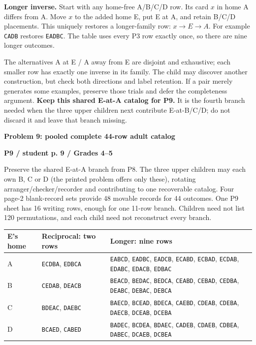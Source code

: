 \documentclass[11pt]{article}
\newcommand{\heading}[1]{\par\textbf{\large #1}\par}
\newcommand{\subhead}[1]{\par\textbf{#1}\par}
\newcommand{\row}[1]{\texttt{#1}}
\newcommand{\guidepage}{\newpage}
\begin{document}
\textbf{Longer inverse.} Start with any home-free A/B/C/D row. Its card $x$ in home A differs from A. Move $x$ to the added home E, put E at A, and retain B/C/D placements. This uniquely restores a longer-family row: $x\to E\to A$. For example \row{CADB} restores \row{EADBC}. The table uses every P3 row exactly once, so there are nine longer outcomes.

The alternatives A at E / A away from E are disjoint and exhaustive; each smaller row has exactly one inverse in its family. The child may discover another construction, but check both directions and label retention. If a pair merely generates some examples, preserve those trials and defer the completeness argument. \textbf{Keep this shared E-at-A catalog for P9.} It is the fourth branch needed when the three upper children next contribute E-at-B/C/D; do not discard it and leave that branch missing.

\guidepage
\heading{Problem 9: pooled complete 44-row adult catalog}
\subhead{P9 / student p. 9 / Grades 4--5}
Preserve the shared E-at-A branch from P8. The three upper children may each own B, C or D (the printed problem offers only these), rotating arranger/checker/recorder and contributing to one recoverable catalog. Four page-2 blank-record sets provide 48 movable records for 44 outcomes. One P9 sheet has 16 writing rows, enough for one 11-row branch. Children need not list 120 permutations, and each child need not reconstruct every branch.

\begin{center}\begin{tabularx}{\linewidth}{@{}p{19mm}>{\raggedright\arraybackslash}p{35mm}X@{}}\toprule
E's home & Reciprocal: two rows & Longer: nine rows\\\midrule
A & \row{ECDBA}, \row{EDBCA} & \row{EABCD}, \row{EADBC}, \row{EADCB}, \row{ECABD}, \row{ECBAD}, \row{ECDAB}, \row{EDABC}, \row{EDACB}, \row{EDBAC}\\[2mm]
B & \row{CEDAB}, \row{DEACB} & \row{BEACD}, \row{BEDAC}, \row{BEDCA}, \row{CEABD}, \row{CEBAD}, \row{CEDBA}, \row{DEABC}, \row{DEBAC}, \row{DEBCA}\\[2mm]
C & \row{BDEAC}, \row{DAEBC} & \row{BAECD}, \row{BCEAD}, \row{BDECA}, \row{CAEBD}, \row{CDEAB}, \row{CDEBA}, \row{DAECB}, \row{DCEAB}, \row{DCEBA}\\[2mm]
D & \row{BCAED}, \row{CABED} & \row{BADEC}, \row{BCDEA}, \row{BDAEC}, \row{CADEB}, \row{CDAEB}, \row{CDBEA}, \row{DABEC}, \row{DCAEB}, \row{DCBEA}\\\bottomrule
\end{tabularx}\end{center}
\end{document}
